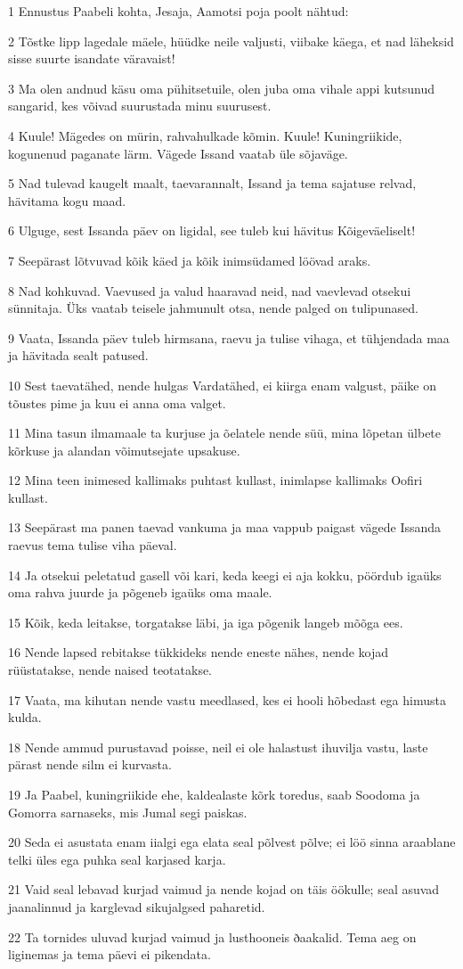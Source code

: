 \par 1 Ennustus Paabeli kohta, Jesaja, Aamotsi poja poolt nähtud:
\par 2 Tõstke lipp lagedale mäele, hüüdke neile valjusti, viibake käega, et nad läheksid sisse suurte isandate väravaist!
\par 3 Ma olen andnud käsu oma pühitsetuile, olen juba oma vihale appi kutsunud sangarid, kes võivad suurustada minu suurusest.
\par 4 Kuule! Mägedes on mürin, rahvahulkade kõmin. Kuule! Kuningriikide, kogunenud paganate lärm. Vägede Issand vaatab üle sõjaväge.
\par 5 Nad tulevad kaugelt maalt, taevarannalt, Issand ja tema sajatuse relvad, hävitama kogu maad.
\par 6 Ulguge, sest Issanda päev on ligidal, see tuleb kui hävitus Kõigeväeliselt!
\par 7 Seepärast lõtvuvad kõik käed ja kõik inimsüdamed löövad araks.
\par 8 Nad kohkuvad. Vaevused ja valud haaravad neid, nad vaevlevad otsekui sünnitaja. Üks vaatab teisele jahmunult otsa, nende palged on tulipunased.
\par 9 Vaata, Issanda päev tuleb hirmsana, raevu ja tulise vihaga, et tühjendada maa ja hävitada sealt patused.
\par 10 Sest taevatähed, nende hulgas Vardatähed, ei kiirga enam valgust, päike on tõustes pime ja kuu ei anna oma valget.
\par 11 Mina tasun ilmamaale ta kurjuse ja õelatele nende süü, mina lõpetan ülbete kõrkuse ja alandan võimutsejate upsakuse.
\par 12 Mina teen inimesed kallimaks puhtast kullast, inimlapse kallimaks Oofiri kullast.
\par 13 Seepärast ma panen taevad vankuma ja maa vappub paigast vägede Issanda raevus tema tulise viha päeval.
\par 14 Ja otsekui peletatud gasell või kari, keda keegi ei aja kokku, pöördub igaüks oma rahva juurde ja põgeneb igaüks oma maale.
\par 15 Kõik, keda leitakse, torgatakse läbi, ja iga põgenik langeb mõõga ees.
\par 16 Nende lapsed rebitakse tükkideks nende eneste nähes, nende kojad rüüstatakse, nende naised teotatakse.
\par 17 Vaata, ma kihutan nende vastu meedlased, kes ei hooli hõbedast ega himusta kulda.
\par 18 Nende ammud purustavad poisse, neil ei ole halastust ihuvilja vastu, laste pärast nende silm ei kurvasta.
\par 19 Ja Paabel, kuningriikide ehe, kaldealaste kõrk toredus, saab Soodoma ja Gomorra sarnaseks, mis Jumal segi paiskas.
\par 20 Seda ei asustata enam iialgi ega elata seal põlvest põlve; ei löö sinna araablane telki üles ega puhka seal karjased karja.
\par 21 Vaid seal lebavad kurjad vaimud ja nende kojad on täis öökulle; seal asuvad jaanalinnud ja karglevad sikujalgsed paharetid.
\par 22 Ta tornides uluvad kurjad vaimud ja lusthooneis ðaakalid. Tema aeg on liginemas ja tema päevi ei pikendata.

